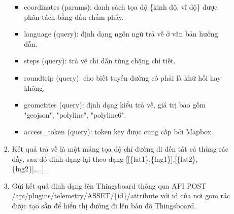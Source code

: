 \begin{itemize}
\begin{itemize}
\begin{enumerate}
\begin{itemize}
                \item coordinates (params): danh sách tọa độ \{kinh độ, vĩ độ\} được phân tách bằng dấu chấm phẩy.
                \item language (query): định dạng ngôn ngữ trả về ở văn bản hướng dẫn.
                \item steps (query): trả về chi dẫn từng chặng chi tiết.
                \item roundtrip (query): cho biết tuyến đường có phải là khứ hồi hay không.
                \item geometries (query): định dạng kiểu trả về, giá trị bao gồm "geojson", "polyline", "polyline6".
                \item access{\_}token (query): token key được cung cấp bởi Mapbox.
            \end{itemize}
            \item Kết quả trả về là một mảng tọa độ chỉ đường đi đến tất cả thùng rác đầy, sau đó định dạng lại theo dạng [[\{lat1\},\{lng1\}],[\{lat2\},\{lng2\}],...].
            \item Gửi kết quả định dạng lên Thingsboard thông qua API POST /api/plugins\newline/telemetry/ASSET/\{id\}/attribute với id của nơi gom rác được tạo sẵn để hiển thị đường đi lên bản đồ Thingsboard.   
        \end{enumerate}
    \end{itemize}


\end{itemize}
